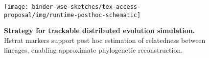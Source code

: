 \begin{figure}
  \vspace{2ex}
    \centering
  \texttt{[image: binder-wse-sketches/tex-access-proposal/img/runtime-posthoc-schematic]}
  \vspace{-1.5ex}
    \caption{\textbf{Strategy for trackable distributed evolution simulation.}
    \footnotesize %
    Hstrat markers support post hoc estimation of relatedness between lineages, enabling approximate phylogenetic reconstruction.
    }
    \label{fig:runtime-posthoc-schematic}
\vspace{-0.2in}
\end{figure}
